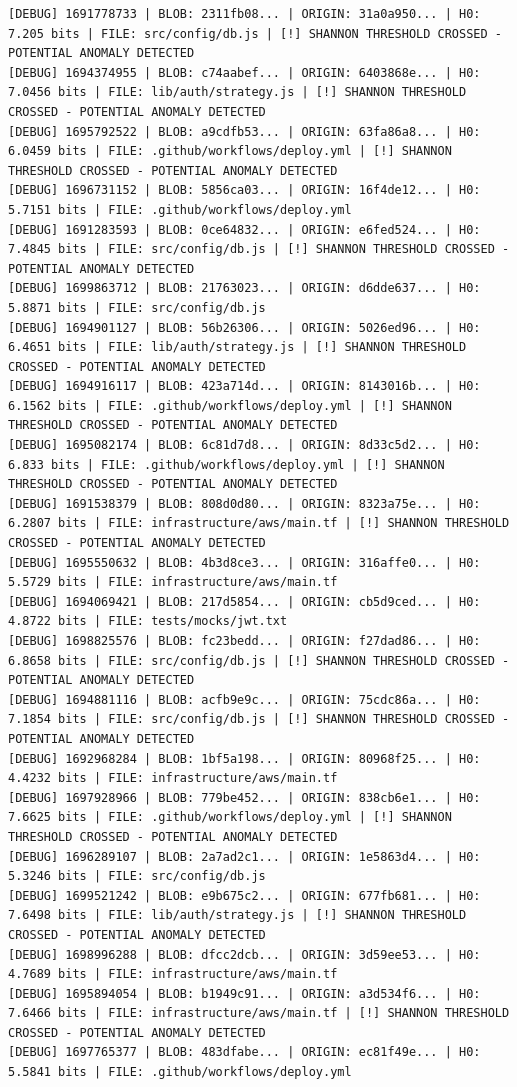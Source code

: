 \documentclass[12pt, a4paper, oneside]{report}
\begin{document}
\begin{lstlisting}[basicstyle=\tiny\ttfamily]
[DEBUG] 1691778733 | BLOB: 2311fb08... | ORIGIN: 31a0a950... | H0: 7.205 bits | FILE: src/config/db.js | [!] SHANNON THRESHOLD CROSSED - POTENTIAL ANOMALY DETECTED
[DEBUG] 1694374955 | BLOB: c74aabef... | ORIGIN: 6403868e... | H0: 7.0456 bits | FILE: lib/auth/strategy.js | [!] SHANNON THRESHOLD CROSSED - POTENTIAL ANOMALY DETECTED
[DEBUG] 1695792522 | BLOB: a9cdfb53... | ORIGIN: 63fa86a8... | H0: 6.0459 bits | FILE: .github/workflows/deploy.yml | [!] SHANNON THRESHOLD CROSSED - POTENTIAL ANOMALY DETECTED
[DEBUG] 1696731152 | BLOB: 5856ca03... | ORIGIN: 16f4de12... | H0: 5.7151 bits | FILE: .github/workflows/deploy.yml
[DEBUG] 1691283593 | BLOB: 0ce64832... | ORIGIN: e6fed524... | H0: 7.4845 bits | FILE: src/config/db.js | [!] SHANNON THRESHOLD CROSSED - POTENTIAL ANOMALY DETECTED
[DEBUG] 1699863712 | BLOB: 21763023... | ORIGIN: d6dde637... | H0: 5.8871 bits | FILE: src/config/db.js
[DEBUG] 1694901127 | BLOB: 56b26306... | ORIGIN: 5026ed96... | H0: 6.4651 bits | FILE: lib/auth/strategy.js | [!] SHANNON THRESHOLD CROSSED - POTENTIAL ANOMALY DETECTED
[DEBUG] 1694916117 | BLOB: 423a714d... | ORIGIN: 8143016b... | H0: 6.1562 bits | FILE: .github/workflows/deploy.yml | [!] SHANNON THRESHOLD CROSSED - POTENTIAL ANOMALY DETECTED
[DEBUG] 1695082174 | BLOB: 6c81d7d8... | ORIGIN: 8d33c5d2... | H0: 6.833 bits | FILE: .github/workflows/deploy.yml | [!] SHANNON THRESHOLD CROSSED - POTENTIAL ANOMALY DETECTED
[DEBUG] 1691538379 | BLOB: 808d0d80... | ORIGIN: 8323a75e... | H0: 6.2807 bits | FILE: infrastructure/aws/main.tf | [!] SHANNON THRESHOLD CROSSED - POTENTIAL ANOMALY DETECTED
[DEBUG] 1695550632 | BLOB: 4b3d8ce3... | ORIGIN: 316affe0... | H0: 5.5729 bits | FILE: infrastructure/aws/main.tf
[DEBUG] 1694069421 | BLOB: 217d5854... | ORIGIN: cb5d9ced... | H0: 4.8722 bits | FILE: tests/mocks/jwt.txt
[DEBUG] 1698825576 | BLOB: fc23bedd... | ORIGIN: f27dad86... | H0: 6.8658 bits | FILE: src/config/db.js | [!] SHANNON THRESHOLD CROSSED - POTENTIAL ANOMALY DETECTED
[DEBUG] 1694881116 | BLOB: acfb9e9c... | ORIGIN: 75cdc86a... | H0: 7.1854 bits | FILE: src/config/db.js | [!] SHANNON THRESHOLD CROSSED - POTENTIAL ANOMALY DETECTED
[DEBUG] 1692968284 | BLOB: 1bf5a198... | ORIGIN: 80968f25... | H0: 4.4232 bits | FILE: infrastructure/aws/main.tf
[DEBUG] 1697928966 | BLOB: 779be452... | ORIGIN: 838cb6e1... | H0: 7.6625 bits | FILE: .github/workflows/deploy.yml | [!] SHANNON THRESHOLD CROSSED - POTENTIAL ANOMALY DETECTED
[DEBUG] 1696289107 | BLOB: 2a7ad2c1... | ORIGIN: 1e5863d4... | H0: 5.3246 bits | FILE: src/config/db.js
[DEBUG] 1699521242 | BLOB: e9b675c2... | ORIGIN: 677fb681... | H0: 7.6498 bits | FILE: lib/auth/strategy.js | [!] SHANNON THRESHOLD CROSSED - POTENTIAL ANOMALY DETECTED
[DEBUG] 1698996288 | BLOB: dfcc2dcb... | ORIGIN: 3d59ee53... | H0: 4.7689 bits | FILE: infrastructure/aws/main.tf
[DEBUG] 1695894054 | BLOB: b1949c91... | ORIGIN: a3d534f6... | H0: 7.6466 bits | FILE: infrastructure/aws/main.tf | [!] SHANNON THRESHOLD CROSSED - POTENTIAL ANOMALY DETECTED
[DEBUG] 1697765377 | BLOB: 483dfabe... | ORIGIN: ec81f49e... | H0: 5.5841 bits | FILE: .github/workflows/deploy.yml
\end{lstlisting}
\end{document}
